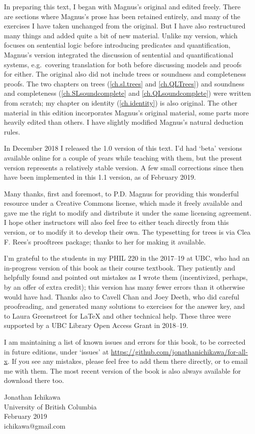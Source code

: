 In preparing this text, I began with Magnus's original and edited freely. There are sections where Magnus's prose has been retained entirely, and many of the exercises I have taken unchanged from the original. But I have also restructured many things and added quite a bit of new material. Unlike my version, which focuses on sentential logic before introducing predicates and quantification, Magnus's version integrated the discussion of sentential and quantificational systems, e.g.\ covering translation for both before discussing models and proofs for either. The original also did not include trees or soundness and completeness proofs. The two chapters on trees (\ref{ch.sl.trees} and \ref{ch.QLTrees}) and soundness and completeness (\ref{ch.SLsoundcomplete} and \ref{ch.QLsoundcomplete}) were written from scratch; my chapter on identity (\ref{ch.identity}) is also original. The other material in this edition incorporates Magnus's original material, some parts more heavily edited than others. I have slightly modified Magnus's natural deduction rules.

In December 2018 I released the 1.0 version of this text. I'd had `beta' versions available online for a couple of years while teaching with them, but the present version represents a relatively stable version. A few small corrections since then have been implemented in this 1.1 version, as of February 2019.

Many thanks, first and foremost, to P.D. Magnus for providing this wonderful resource under a Creative Commons license, which made it freely available and gave me the right to modify and distribute it under the same licensing agreement. I hope other instructors will also feel free to either teach directly from this version, or to modify it to develop their own. The typesetting for trees is via Clea F. Rees's prooftrees package; thanks to her for making it available.

I'm grateful to the students in my PHIL 220 in the 2017--19 at UBC, who had an in-progress version of this book as their course textbook. They patiently and helpfully found and pointed out mistakes as I wrote them (incentivized, perhaps, by an offer of extra credit); this version has many fewer errors than it otherwise would have had. Thanks also to Cavell Chan and Joey Deeth, who did careful proofreading, and generated many solutions to exercises for the answer key, and to Laura Greenstreet for LaTeX and other technical help. These three were supported by a UBC Library Open Access Grant in 2018--19.

I am maintaining a list of known issues and errors for this book, to be corrected in future editions, under `issues' at \url{https://github.com/jonathanichikawa/for-all-x}. If you see any mistakes, please feel free to add them there directly, or to email me with them. The most recent version of the book is also always available for download there too.

\begin{flushright}
Jonathan Ichikawa \\
University of British Columbia \\
February 2019 \\
ichikawa@gmail.com
\end{flushright}
